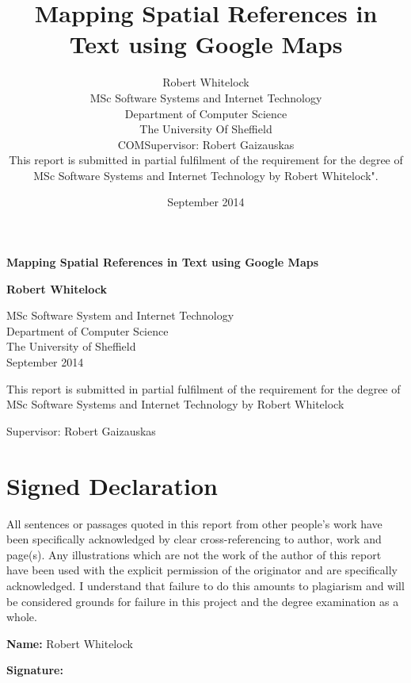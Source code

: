 \documentclass[12pt, a4paper]{report}
\title{Mapping Spatial References in Text using Google Maps}
\date{September 2014}
\author{Robert Whitelock\\ MSc Software Systems and Internet Technology\\ Department of Computer Science\\ The University Of Sheffield\\ COMSupervisor: Robert Gaizauskas\\ This report is submitted in partial fulfilment of the requirement for the degree of MSc Software Systems and Internet Technology by Robert Whitelock".}
\begin{document}
\begin{titlepage}
    \begin{center}
        \vspace*{1cm}
        
        \Huge
        \textbf{Mapping Spatial References in Text using Google Maps}
                
        \vspace{1.5cm}
        
        \textbf{Robert Whitelock}
        
        \vfill
        
        \vspace{0.8cm}
        
        
        \Large
        MSc Software System and Internet Technology\\
        Department of Computer Science\\
        The University of Sheffield\\
        September 2014
        
        \vspace{0.8cm}
        
        This report is submitted in partial fulfilment of the requirement for the degree of MSc Software Systems and Internet Technology by Robert Whitelock
        
        Supervisor: Robert Gaizauskas
        
    \end{center}
\end{titlepage}

\chapter*{Signed Declaration}

All sentences or passages quoted in this report from other people's work have been specifically acknowledged by clear cross-referencing to author, work and page(s). Any illustrations which are not the work of the author of this report have been used with the explicit permission of the originator and are specifically acknowledged. I understand that failure to do this amounts to plagiarism and will be considered grounds for failure in this project and the degree examination as a whole.

\textbf{Name:} Robert Whitelock

\textbf{Signature:}
\end{document}
